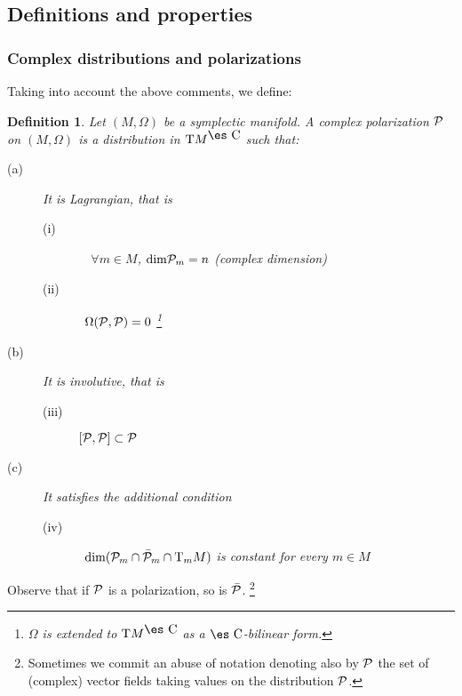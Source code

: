 \documentclass[12pt]{article}
\newtheorem{definition}{Definition}
\def\P{{\cal P}}
\def\Complex{\mbox{\es C}}
\def\Tan{{\rm T}}
\begin{document}
\subsection{Definitions and properties}


\subsubsection{Complex distributions and polarizations}


Taking into account the above comments,
we define:

\begin{definition}
Let $(M,\Omega )$ be a symplectic manifold.
A {\rm complex polarization} $\P$
on $(M,\Omega )$ is a distribution in $\Tan M^{\Complex}$
such that:
\begin{description}
\item[{\rm (a)}]
It is {\it Lagrangian}, that is
\begin{description}
\item[{\rm (i)}]\ \
$\forall m \in M$,
${\rm dim} \P_m = n$ (complex dimension)
\item[{\rm (ii)}]\
$\Omega (\P ,\P ) = 0$ \footnote{ $\Omega$ is extended to $\Tan
M^{\Complex}$ as a $\Complex$-bilinear form.}
\end{description}
\item[{\rm (b)}]
It is {\it involutive}, that is
\begin{description}
\item[{\rm (iii)}]
$[\P ,\P ] \subset \P$
\end{description}
\item[{\rm (c)}]
It satisfies the additional condition
\begin{description}
\item[{\rm (iv)}]\
$\dim (\P_m \cap \bar \P_m \cap \Tan_m M)$
is constant for every $m \in M$
\end{description}
\end{description}
\label{pol}
\end{definition}

Observe that if $\P$ is a polarization,
so is $\bar \P$.%
\footnote{
Sometimes we commit an abuse of notation
denoting also by $\P$ the set of (complex) vector fields
taking values on the distribution $\P$.}
\end{document}
